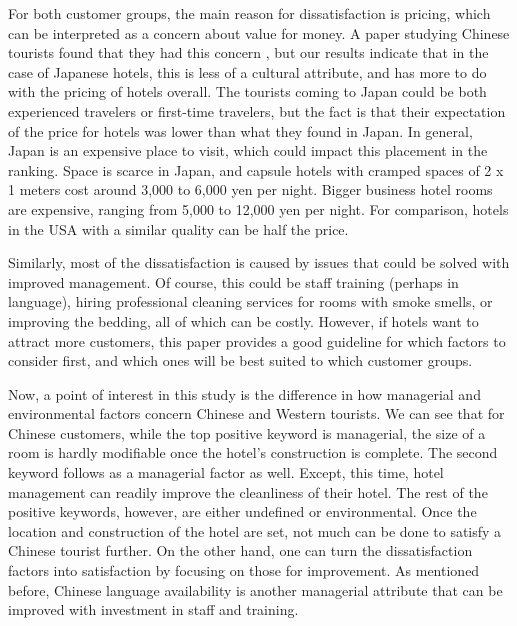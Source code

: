 \documentclass[smallextended,natbib]{svjour3}       %
\begin{document}
    For both customer groups, the main reason for dissatisfaction is pricing, which can be interpreted as a concern about value for money. A paper studying Chinese tourists found that they had this concern \cite[][]{truong2009}, but our results indicate that in the case of Japanese hotels, this is less of a cultural attribute, and has more to do with the pricing of hotels overall. The tourists coming to Japan could be both experienced travelers or first-time travelers, but the fact is that their expectation of the price for hotels was lower than what they found in Japan. In general, Japan is an expensive place to visit, which could impact this placement in the ranking. Space is scarce in Japan, and capsule hotels with cramped spaces of 2 x 1  meters cost around 3,000 to 6,000 yen per night. Bigger business hotel rooms are expensive, ranging from 5,000 to 12,000 yen per night. For comparison, hotels in the USA with a similar quality can be half the price. 

    Similarly, most of the dissatisfaction is caused by issues that could be solved with improved management. Of course, this could be staff training (perhaps in language), hiring professional cleaning services for rooms with smoke smells, or improving the bedding, all of which can be costly. However, if hotels want to attract more customers, this paper provides a good guideline for which factors to consider first, and which ones will be best suited to which customer groups. 

    Now, a point of interest in this study is the difference in how managerial and environmental factors concern Chinese and Western tourists. We can see that for Chinese customers, while the top positive keyword is managerial, the size of a room is hardly modifiable once the hotel's construction is complete. The second keyword follows as a managerial factor as well. Except, this time, hotel management can readily improve the cleanliness of their hotel. The rest of the positive keywords, however, are either undefined or environmental. Once the location and construction of the hotel are set, not much can be done to satisfy a Chinese tourist further. On the other hand, one can turn the dissatisfaction factors into satisfaction by focusing on those for improvement. As mentioned before, Chinese language availability is another managerial attribute that can be improved with investment in staff and training. 
\end{document}
